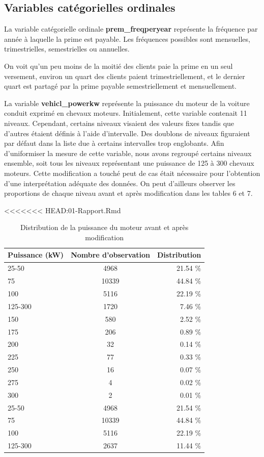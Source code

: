 \documentclass[
]{article}
\begin{document}
\hypertarget{variables-catuxe9gorielles-ordinales}{%
\subsection{Variables catégorielles
ordinales}\label{variables-catuxe9gorielles-ordinales}}

La variable catégorielle ordinale \textbf{prem\_freqperyear} représente
la fréquence par année à laquelle la prime est payable. Les fréquences
possibles sont mensuelles, trimestrielles, semestrielles ou annuelles.

On voit qu'un peu moins de la moitié des clients paie la prime en un
seul versement, environ un quart des clients paient trimestriellement,
et le dernier quart est partagé par la prime payable semestriellement et
mensuellement.

La variable \textbf{vehicl\_powerkw} représente la puissance du moteur
de la voiture conduit exprimé en chevaux moteurs. Initialement, cette
variable contenait 11 niveaux. Cependant, certains niveaux visaient des
valeurs fixes tandis que d'autres étaient définis à l'aide d'intervalle.
Des doublons de niveaux figuraient par défaut dans la liste due à
certains intervalles trop englobants. Afin d'uniformiser la mesure de
cette variable, nous avons regroupé certains niveaux ensemble, soit tous
les niveaux représentant une puissance de 125 à 300 chevaux moteurs.
Cette modification a touché peut de cas était nécessaire pour
l'obtention d'une interprétation adéquate des données. On peut
d'ailleurs observer les proportions de chaque niveau avant et après
modification dans les tables 6 et 7.

\textless\textless\textless\textless\textless\textless\textless{}
HEAD:01-Rapport.Rmd

\begin{table}[ht]
\centering
\caption{Distribution de la puissance du moteur avant et après modification} 
\label{}
\begin{tabular}{lcr}
  \hline
Puissance (kW) & Nombre d'observation & Distribution \\ 
  \hline
25-50 & 4968 & 21.54 \% \\ 
  75 & 10339 & 44.84 \% \\ 
  100 & 5116 & 22.19 \% \\ 
  125-300 & 1720 & 7.46 \% \\ 
  150 & 580 & 2.52 \% \\ 
  175 & 206 & 0.89 \% \\ 
  200 & 32 & 0.14 \% \\ 
  225 & 77 & 0.33 \% \\ 
  250 & 16 & 0.07 \% \\ 
  275 & 4 & 0.02 \% \\ 
   \hline
300 & 2 & 0.01 \% \\ 
  25-50 & 4968 & 21.54 \% \\ 
  75 & 10339 & 44.84 \% \\ 
  100 & 5116 & 22.19 \% \\ 
  125-300 & 2637 & 11.44 \% \\ 
   \hline
\end{tabular}
\end{table}
\end{document}
